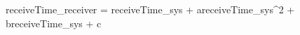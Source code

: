 receiveTime_{receiver} = receiveTime_{sys} + a{\cdot}receiveTime_{sys}^2 + b{\cdot}receiveTime_{sys} + c